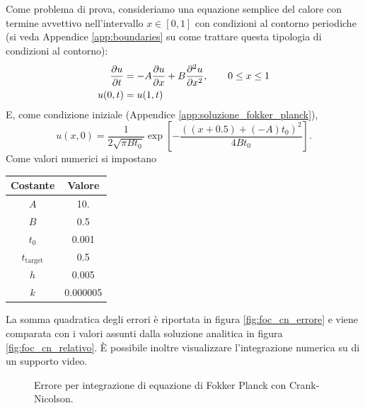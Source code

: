 \documentclass[10pt,a4paper]{article}
\begin{document}
Come problema di prova, consideriamo una equazione semplice del calore con termine avvettivo nell'intervallo $x\in[0,1]$ con condizioni al contorno periodiche (si veda Appendice \ref{app:boundaries} su come trattare questa tipologia di condizioni al contorno):
\begin{align}
	\pdv{u}{t} &= -A\pdv{u}{x} + B\pdv[2]{u}{x},\quad\quad 0\leq x\leq 1\\
	u(0,t) &= u(1,t)
\end{align}
E, come condizione iniziale (Appendice \ref{app:soluzione_fokker_planck}),
\begin{equation}
	u(x,0) = \frac{1}{2\sqrt{\pi B t_0}}\exp\left[-\frac{((x+0.5)+(-A)t_0)^2}{4Bt_0}\right].
\end{equation}
Come valori numerici si impostano\\
\begin{center}
	\begin{tabular}{cS}
	 \toprule
	 Costante & {Valore}\\
	 \midrule
	 $A$ & 10.\\
	 $B$ & 0.5\\
	 $t_0$ & 0.001\\
	 $t_{\text{target}}$ & 0.5\\
	 $h$ & 0.005\\
	 $k$ & 0.000005\\
	 \bottomrule 
	\end{tabular}
\end{center}
La somma quadratica degli errori è riportata in figura \ref{fig:foc_cn_errore} e viene comparata con i valori assunti dalla soluzione analitica in figura \ref{fig:foc_cn_relativo}. È possibile inoltre visualizzare l'integrazione numerica su di un supporto video.

\begin{figure}
	\centering
	\quad
	\caption{Errore per integrazione di equazione di Fokker Planck con Crank-Nicolson.}
	\label{fig:implicito}
\end{figure}
\end{document}
